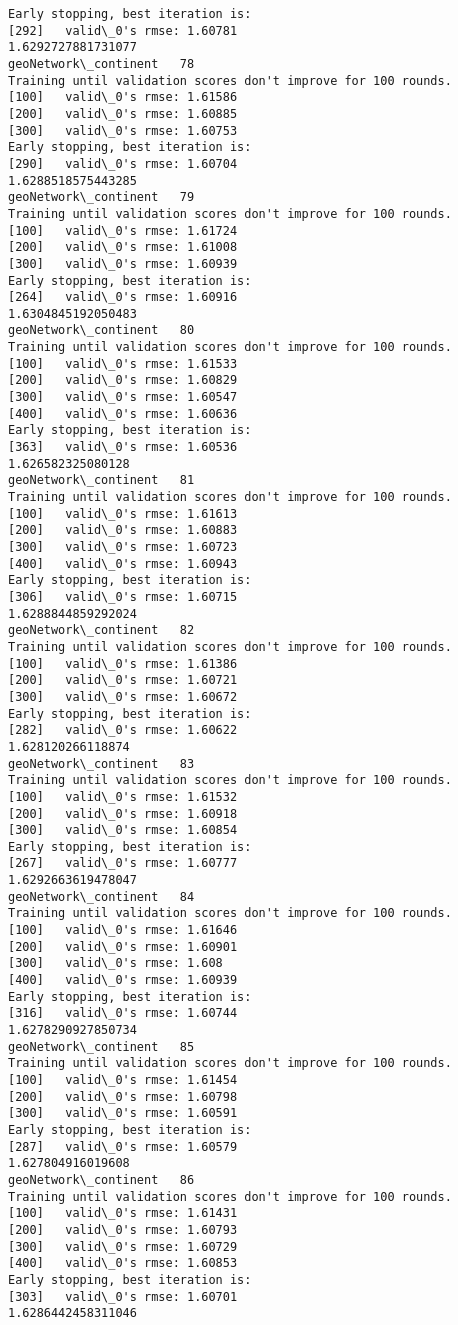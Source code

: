 \documentclass[11pt]{article}
\begin{document}
\begin{Verbatim}[commandchars=\\\{\}]
Early stopping, best iteration is:
[292]	valid\_0's rmse: 1.60781
1.6292727881731077
geoNetwork\_continent   78
Training until validation scores don't improve for 100 rounds.
[100]	valid\_0's rmse: 1.61586
[200]	valid\_0's rmse: 1.60885
[300]	valid\_0's rmse: 1.60753
Early stopping, best iteration is:
[290]	valid\_0's rmse: 1.60704
1.6288518575443285
geoNetwork\_continent   79
Training until validation scores don't improve for 100 rounds.
[100]	valid\_0's rmse: 1.61724
[200]	valid\_0's rmse: 1.61008
[300]	valid\_0's rmse: 1.60939
Early stopping, best iteration is:
[264]	valid\_0's rmse: 1.60916
1.6304845192050483
geoNetwork\_continent   80
Training until validation scores don't improve for 100 rounds.
[100]	valid\_0's rmse: 1.61533
[200]	valid\_0's rmse: 1.60829
[300]	valid\_0's rmse: 1.60547
[400]	valid\_0's rmse: 1.60636
Early stopping, best iteration is:
[363]	valid\_0's rmse: 1.60536
1.626582325080128
geoNetwork\_continent   81
Training until validation scores don't improve for 100 rounds.
[100]	valid\_0's rmse: 1.61613
[200]	valid\_0's rmse: 1.60883
[300]	valid\_0's rmse: 1.60723
[400]	valid\_0's rmse: 1.60943
Early stopping, best iteration is:
[306]	valid\_0's rmse: 1.60715
1.6288844859292024
geoNetwork\_continent   82
Training until validation scores don't improve for 100 rounds.
[100]	valid\_0's rmse: 1.61386
[200]	valid\_0's rmse: 1.60721
[300]	valid\_0's rmse: 1.60672
Early stopping, best iteration is:
[282]	valid\_0's rmse: 1.60622
1.628120266118874
geoNetwork\_continent   83
Training until validation scores don't improve for 100 rounds.
[100]	valid\_0's rmse: 1.61532
[200]	valid\_0's rmse: 1.60918
[300]	valid\_0's rmse: 1.60854
Early stopping, best iteration is:
[267]	valid\_0's rmse: 1.60777
1.6292663619478047
geoNetwork\_continent   84
Training until validation scores don't improve for 100 rounds.
[100]	valid\_0's rmse: 1.61646
[200]	valid\_0's rmse: 1.60901
[300]	valid\_0's rmse: 1.608
[400]	valid\_0's rmse: 1.60939
Early stopping, best iteration is:
[316]	valid\_0's rmse: 1.60744
1.6278290927850734
geoNetwork\_continent   85
Training until validation scores don't improve for 100 rounds.
[100]	valid\_0's rmse: 1.61454
[200]	valid\_0's rmse: 1.60798
[300]	valid\_0's rmse: 1.60591
Early stopping, best iteration is:
[287]	valid\_0's rmse: 1.60579
1.627804916019608
geoNetwork\_continent   86
Training until validation scores don't improve for 100 rounds.
[100]	valid\_0's rmse: 1.61431
[200]	valid\_0's rmse: 1.60793
[300]	valid\_0's rmse: 1.60729
[400]	valid\_0's rmse: 1.60853
Early stopping, best iteration is:
[303]	valid\_0's rmse: 1.60701
1.6286442458311046

\end{Verbatim}
\end{document}
